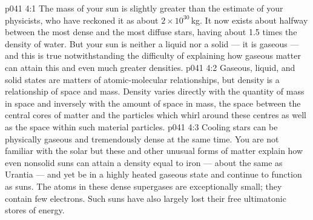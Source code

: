 \vs p041 4:1 The mass of your sun is slightly greater than the estimate of your physicists, who have reckoned it as about $2\times 10^{30}$\,kg. It now exists about halfway between the most dense and the most diffuse stars, having about 1.5 times the density of water. But your sun is neither a liquid nor a solid --- it is gaseous --- and this is true notwithstanding the difficulty of explaining how gaseous matter can attain this and even much greater densities.
\vs p041 4:2 \pc Gaseous, liquid, and solid states are matters of atomic\hyp{}molecular relationships, but density is a relationship of space and mass. Density varies directly with the quantity of mass in space and inversely with the amount of space in mass, the space between the central cores of matter and the particles which whirl around these centres as well as the space within such material particles.
\vs p041 4:3 \pc Cooling stars can be physically gaseous and tremendously dense at the same time. You are not familiar with the solar  but these and other unusual forms of matter explain how even nonsolid suns can attain a density equal to iron --- about the same as Urantia --- and yet be in a highly heated gaseous state and continue to function as suns. The atoms in these dense supergases are exceptionally small; they contain few electrons. Such suns have also largely lost their free ultimatonic stores of energy.
